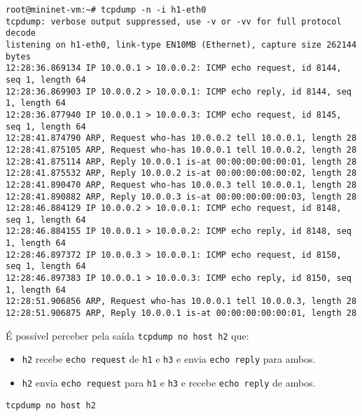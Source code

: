 \documentclass[12pt,letterpaper]{article}
\begin{document}
\begin{tiny}
\begin{verbatim}
root@mininet-vm:~# tcpdump -n -i h1-eth0
tcpdump: verbose output suppressed, use -v or -vv for full protocol decode
listening on h1-eth0, link-type EN10MB (Ethernet), capture size 262144 bytes
12:28:36.869134 IP 10.0.0.1 > 10.0.0.2: ICMP echo request, id 8144, seq 1, length 64
12:28:36.869903 IP 10.0.0.2 > 10.0.0.1: ICMP echo reply, id 8144, seq 1, length 64
12:28:36.877940 IP 10.0.0.1 > 10.0.0.3: ICMP echo request, id 8145, seq 1, length 64
12:28:41.874790 ARP, Request who-has 10.0.0.2 tell 10.0.0.1, length 28
12:28:41.875105 ARP, Request who-has 10.0.0.1 tell 10.0.0.2, length 28
12:28:41.875114 ARP, Reply 10.0.0.1 is-at 00:00:00:00:00:01, length 28
12:28:41.875532 ARP, Reply 10.0.0.2 is-at 00:00:00:00:00:02, length 28
12:28:41.890470 ARP, Request who-has 10.0.0.3 tell 10.0.0.1, length 28
12:28:41.890882 ARP, Reply 10.0.0.3 is-at 00:00:00:00:00:03, length 28
12:28:46.884129 IP 10.0.0.2 > 10.0.0.1: ICMP echo request, id 8148, seq 1, length 64
12:28:46.884155 IP 10.0.0.1 > 10.0.0.2: ICMP echo reply, id 8148, seq 1, length 64
12:28:46.897372 IP 10.0.0.3 > 10.0.0.1: ICMP echo request, id 8150, seq 1, length 64
12:28:46.897383 IP 10.0.0.1 > 10.0.0.3: ICMP echo reply, id 8150, seq 1, length 64
12:28:51.906856 ARP, Request who-has 10.0.0.1 tell 10.0.0.3, length 28
12:28:51.906875 ARP, Reply 10.0.0.1 is-at 00:00:00:00:00:01, length 28
\end{verbatim}
\end{tiny} 

É possível perceber pela saída \texttt{tcpdump no host h2} que:
\begin{itemize}
    \item \texttt{h2} recebe \texttt{echo request} de \texttt{h1} e \texttt{h3} e envia \texttt{echo reply} para ambos.
    \item \texttt{h2} envia \texttt{echo request} para \texttt{h1} e \texttt{h3} e recebe \texttt{echo reply} de ambos.
\end{itemize}

\begin{verbatim}
tcpdump no host h2
\end{verbatim}
\end{document}
